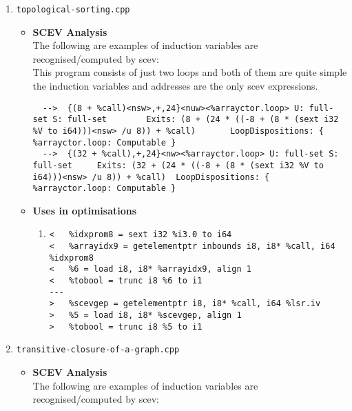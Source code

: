 \documentclass[12pt]{article}
\begin{document}
\begin{enumerate}
\begin{itemize}
\begin{enumerate}
\begin{lstlisting}
\end{lstlisting}
\end{enumerate}
\end{itemize}
\item \texttt{topological-sorting.cpp}
\begin{itemize}
\item \textbf{SCEV Analysis}\\
The following are examples of induction variables are recognised/computed by scev:\\
This program consists of just two loops and both of them are quite simple the induction variables and addresses are the only scev expressions.
\begin{lstlisting}
  -->  {(8 + %call)<nsw>,+,24}<nuw><%arrayctor.loop> U: full-set S: full-set		Exits: (8 + (24 * ((-8 + (8 * (sext i32 %V to i64)))<nsw> /u 8)) + %call)		LoopDispositions: { %arrayctor.loop: Computable }
  -->  {(32 + %call),+,24}<nw><%arrayctor.loop> U: full-set S: full-set		Exits: (32 + (24 * ((-8 + (8 * (sext i32 %V to i64)))<nsw> /u 8)) + %call)	LoopDispositions: { %arrayctor.loop: Computable }
\end{lstlisting}
\item \textbf{Uses in optimisations}
\begin{enumerate}
\item \begin{lstlisting}
<   %idxprom8 = sext i32 %i3.0 to i64
<   %arrayidx9 = getelementptr inbounds i8, i8* %call, i64 %idxprom8
<   %6 = load i8, i8* %arrayidx9, align 1
<   %tobool = trunc i8 %6 to i1
---
>   %scevgep = getelementptr i8, i8* %call, i64 %lsr.iv
>   %5 = load i8, i8* %scevgep, align 1
>   %tobool = trunc i8 %5 to i1

\end{lstlisting}
\end{enumerate}
\end{itemize}
\item \texttt{transitive-closure-of-a-graph.cpp}
\begin{itemize}
\item \textbf{SCEV Analysis}\\
The following are examples of induction variables are recognised/computed by scev:\\


\end{itemize}
\end{enumerate}
\end{document}
